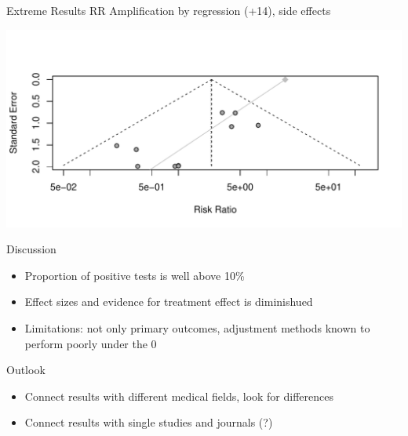 \documentclass[english]{beamer}\usepackage[]{graphicx}\usepackage[]{color}
\makeatletter
\def\maxwidth{ %
  \ifdim\Gin@nat@width>\linewidth
    \linewidth
  \else
    \Gin@nat@width
  \fi
}
\newenvironment{knitrout}{}{} %
\makeatother
\begin{document}
\begin{frame}[fragile]{Extreme Results}
RR Amplification by regression (+14), side effects

\begin{knitrout}
\color{fgcolor}
\includegraphics[width=\maxwidth]{figure/unnamed-chunk-22-1} 

\end{knitrout}
\end{frame}

\begin{frame}[fragile]{Discussion}
\begin{itemize}
\item Proportion of positive tests is well above 10\%
\item Effect sizes and evidence for treatment effect is diminishued
\item Limitations: not only primary outcomes, adjustment methods known to
perform poorly under the 0
\end{itemize}
\end{frame}


\begin{frame}[fragile]{Outlook}
\begin{itemize}
\item Connect results with different medical fields, look for differences
\item Connect results with single studies and journals (?)
\end{itemize}
\end{frame}













\end{document}
